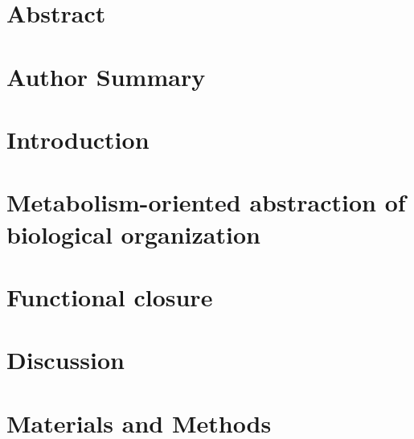 





\listoftodos

\section*{Abstract}

\section*{Author Summary}

%

\section*{Introduction}


\section*{Metabolism-oriented abstraction of biological organization}


\section*{Functional closure}


\section*{Discussion}

\section*{Materials and Methods}
